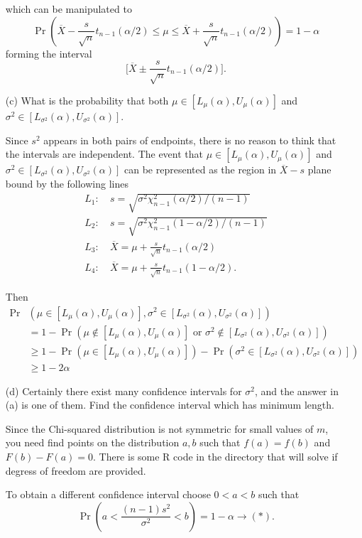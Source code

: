 \documentclass{tufte-book}
\begin{document}
\begin{enumerate}
which can be manipulated to
\[ \Pr( \overline{X}-\frac{s}{\sqrt{n}}t_{n-1}(\alpha/2)\leq \mu \leq \overline{X}+\frac{s}{\sqrt{n}}t_{n-1}(\alpha/2)) = 1-\alpha \]
forming the interval
\[ \big[ \overline{X} \pm \frac{s}{\sqrt{n}}t_{n-1}(\alpha/2) \big]. \]

\item[(c)] What is the probability that both $\mu \in [L_\mu(\alpha), U_\mu(\alpha)]$ and $\sigma^2 \in [L_{\sigma^2}(\alpha), U_{\sigma^2}(\alpha)]$.

Since $s^2$ appears in both pairs of endpoints, there is no reason to think that the intervals are independent.  The event that $\mu \in [L_{\mu}(\alpha), U_\mu(\alpha)]$ and $\sigma^2 \in [L_{\sigma^2}(\alpha), U_{\sigma^2}(\alpha)]$ can be represented as the region in $\overline{X} - s$ plane bound by the following lines
\begin{align*}
L_1:& \ s = \sqrt{\sigma^2 \chi_{n-1}^2(\alpha/2)/(n-1)}\\
L_2:& \ s = \sqrt{\sigma^2 \chi_{n-1}^2(1-\alpha/2)/(n-1)}\\
L_3:& \ \overline{X} = \mu + \frac{s}{\sqrt{n}}t_{n-1}(\alpha/2)\\
L_4:& \ \overline{X} = \mu + \frac{s}{\sqrt{n}}t_{n-1}(1-\alpha/2).
\end{align*}

Then
\begin{align*}
\Pr&(\mu \in [L_{\mu}(\alpha), U_\mu(\alpha)], \sigma^2 \in [L_{\sigma^2}(\alpha), U_{\sigma^2}(\alpha)])\\
&= 1 -\Pr(\mu \not\in [L_{\mu}(\alpha), U_\mu(\alpha)] \text{ or } \sigma^2 \not\in [L_{\sigma^2}(\alpha), U_{\sigma^2}(\alpha)])\\
&\geq 1 - \Pr(\mu \in [L_{\mu}(\alpha), U_\mu(\alpha)])-  \Pr(\sigma^2 \in [L_{\sigma^2}(\alpha), U_{\sigma^2}(\alpha)])\\
&\geq 1 - 2\alpha
\end{align*}

\item[(d)] Certainly there exist many confidence intervals for $\sigma^2$, and the answer in (a) is one of them.  Find the confidence interval which has minimum length.

Since the Chi-squared distribution is not symmetric for small values of $m$, you need find points on the distribution $a,b$ such that $f(a)=f(b)$ and $F(b)-F(a)=0$.  There is some R code in the directory that will solve if degress of freedom are provided.

To obtain a different confidence interval choose $0<a<b$ such that
\[ \Pr(a < \frac{(n-1)s^2}{\sigma^2} < b) = 1-\alpha \rightarrow (*). \]


\end{enumerate}
\end{document}
